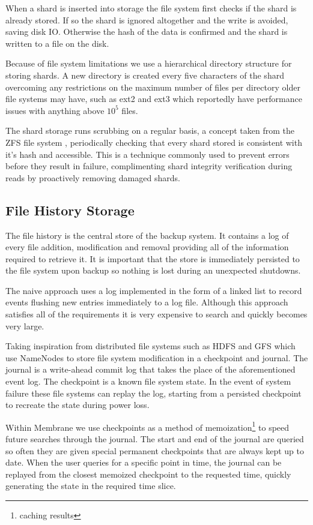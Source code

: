 \documentclass[11pt, a4paper, twocolumn, twoside]{report}
\begin{document}
When a shard is inserted into storage the file system first checks if the shard is already stored. If so the shard is ignored altogether and the write is avoided, saving disk IO. Otherwise the hash of the data is confirmed and the shard is written to a file on the disk.

Because of file system limitations we use a hierarchical directory structure for storing shards. A new directory is created every five characters of the shard overcoming any restrictions on the maximum number of files per directory older file systems may have, such as ext2 and ext3 which reportedly have performance issues with anything above $10^5$ files. \citep{johnson2014files}

The shard storage runs scrubbing on a regular basis, a concept taken from the ZFS file system \citep{oracle2012zfs}, periodically checking that every shard stored is consistent with it's hash and accessible. This is a technique commonly used to prevent errors before they result in failure, complimenting shard integrity verification during reads by proactively removing damaged shards.

\subsection{File History Storage}

The file history is the central store of the backup system. It contains a log of every file addition, modification and removal providing all of the information required to retrieve it. It is important that the store is immediately persisted to the file system upon backup so nothing is lost during an unexpected shutdowns.

The naive approach uses a log implemented in the form of a linked list to record events flushing new entries immediately to a log file. Although this approach satisfies all of the requirements it is very expensive to search and quickly becomes very large.

Taking inspiration from distributed file systems such as HDFS \citep{hdfsAnalysis} and GFS \citep{mckusick2010gfs} which use NameNodes to store file system modification in a checkpoint and journal. The journal is a write-ahead commit log that takes the place of the aforementioned event log. The checkpoint is a known file system state. In the event of system failure these file systems can replay the log, starting from a persisted checkpoint to recreate the state during power loss.

Within Membrane we use checkpoints as a method of memoization\footnote{caching results} to speed future searches through the journal. The start and end of the journal are queried so often they are given special permanent checkpoints that are always kept up to date. When the user queries for a specific point in time, the journal can be replayed from the closest memoized checkpoint to the requested time, quickly generating the state in the required time slice.
\end{document}
